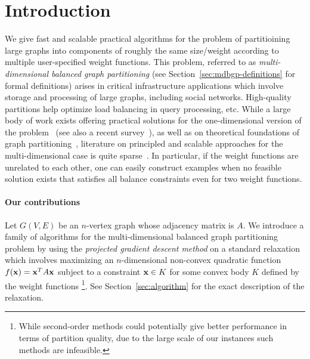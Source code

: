 \section{Introduction}\label{sec:intro}

We give fast and scalable practical algorithms for the problem of partitioining large graphs into components of roughly the same size/weight according to multiple user-specified weight functions. This problem, referred to as \textit{multi-dimensional balanced graph partitioning} (see Section~\ref{sec:mdbgp-definitions} for formal definitions) arises in critical infrastructure applications which involve storage and processing of large graphs, including social networks. High-quality partitions help optimize load balancing in query processing,  etc.  
While a large body of work exists offering practical solutions for the one-dimensional version of the problem~\cite{KK95, DGRW12, UB13, TGRV14, ABM16, DKKOPS16, MLLS17, KKPPSAP17} (see also a recent survey~\cite{BMSSS16}), as well as on theoretical foundations of graph partitioning~\cite{KNS09,AFKRS14,MM14}, literature on principled and scalable approaches for the multi-dimensional case is quite sparse~\cite{}. In particular, if the weight functions are unrelated to each other, one can easily construct examples when no feasible solution exists that satisfies all balance constraints even for two weight functions. 

\paragraph {Our contributions}
Let $G(V,E)$ be an $n$-vertex graph whose adjacency matrix is $A$. We introduce a family of algorithms for the multi-dimensional balanced graph partitioning problem by using the \textit{projected gradient descent method} on a standard relaxation which involves maximizing an $n$-dimensional non-convex quadratic function $f(\mathbf x) = \mathbf x^T A \mathbf x$ subject to a constraint $\mathbf x \in K$ for some convex body $K$ defined by the weight functions \footnote{While second-order methods could potentially give better performance in terms of partition quality, due to the large scale of our instances such methods are infeasible.}. See Section~\ref{sec:algorithm} for the exact description of the relaxation.

